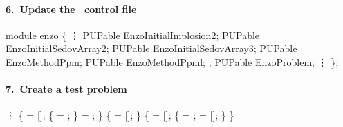 
\begin{frame}[fragile] 
\secframetitle{\ssDevelMethod}
\framesubtitle{6.~Update the \charm\ control file }

\footnotesize
\begin{semiverbatim}
   module enzo \{
       \vdots
     PUPable EnzoInitialImplosion2;
     PUPable EnzoInitialSedovArray2;
     PUPable EnzoInitialSedovArray3;
     PUPable EnzoMethodPpm;
     PUPable EnzoMethodPpml;
      ;
     PUPable EnzoProblem;
       \vdots
   \};
\end{semiverbatim}
\end{frame}



\begin{frame}[fragile] 
\secframetitle{\ssDevelMethod}
\framesubtitle{7.~Create a  test problem}
\scriptsize
\vspace{-0.15in}
\begin{semiverbatim}
      \vdots
    \{
      = []; 
      \{  = ; \} 
      = ;
   \}
\pause
    \{
       = [];
   \}
\pause
    \{
       = [];
       \{
          = ;
          = [];
      \}
   \}
\end{semiverbatim}

\end{frame}



